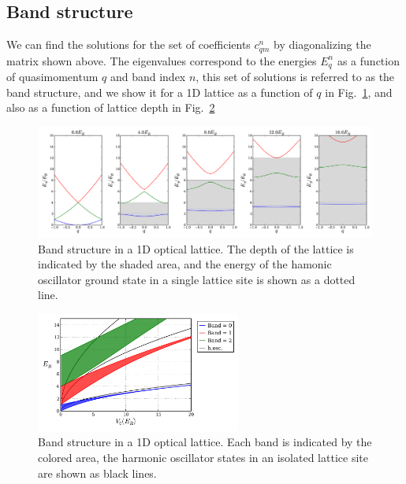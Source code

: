 \documentclass[11pt,letter]{article}
\begin{document}
\subsection{Band structure}

We can find the solutions for the set of coefficients $c_{qm}^{n}$ by
diagonalizing the matrix shown above.  The eigenvalues correspond to the
energies $E_{q}^{n}$ as a function of quasimomentum $q$ and band index $n$,
this set of solutions is referred to as the band structure, and we show it for
a 1D lattice as a function of $q$ in Fig.~\ref{fig:bands1d}, and also as a function of lattice depth in Fig.~\ref{fig:bands1d_V0}
\begin{figure}
\centering \includegraphics[width=\textwidth]{../BandStructure_figures/bands1d.pdf}
\caption[Band structure in 1D lattice.]{\small Band structure in a 1D optical lattice.  The depth of the lattice is indicated by the shaded area, and the energy of the hamonic oscillator ground state in a single lattice site is shown as a dotted line.  }
\label{fig:bands1d}
\end{figure}
\begin{figure}
\centering \includegraphics[width=0.6\textwidth]{../BandStructure_figures/bands1d_V0.pdf}
\caption[Band structure in 1D lattice.]{\small Band structure in a 1D optical lattice.  Each band is indicated by the colored area,  the harmonic oscillator states in an isolated lattice site are shown as black lines. }
\label{fig:bands1d_V0}
\end{figure}
\end{document}
